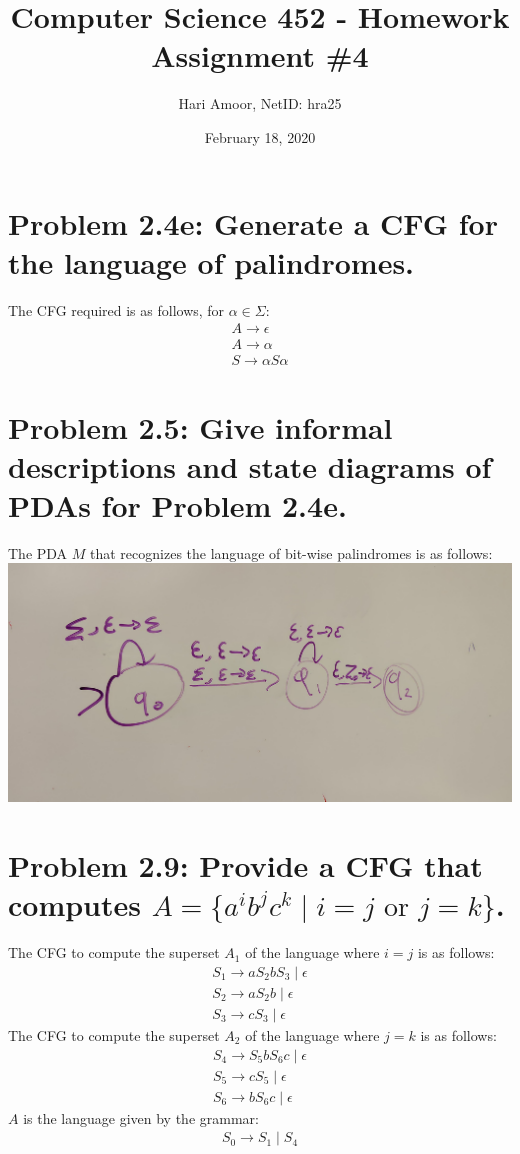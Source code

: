 \documentclass[12pt]{article}
\title{Computer Science 452 - Homework Assignment \#4}
\author{Hari Amoor, NetID: hra25}
\date{February 18, 2020}
\begin{document}
\maketitle
\section*{Problem 2.4e: Generate a CFG for the language of palindromes.}
The CFG required is as follows, for $\alpha \in \Sigma$:
\begin{align*}
  A \rightarrow \epsilon \\
  A \rightarrow \alpha \\
  S \rightarrow \alpha S \alpha
\end{align*}

\section*{Problem 2.5: Give informal descriptions and state diagrams of PDAs for Problem 2.4e.}
The PDA $M$ that recognizes the language of bit-wise palindromes is as follows: \\
\newline
\includegraphics[width=\linewidth]{images/problem25.jpg}

\section*{Problem 2.9: Provide a CFG that computes $A = \{a^{i}b^{j}c^{k} \mid i = j \text{ or } j = k\}$.}
The CFG to compute the superset $A_{1}$ of the language where $i = j$ is as follows:
\begin{align*}
  S_{1} \rightarrow aS_{2}bS_{3} \mid \epsilon \\
  S_{2} \rightarrow aS_{2}b \mid \epsilon \\
  S_{3} \rightarrow cS_{3} \mid \epsilon
\end{align*}
The CFG to compute the superset $A_{2}$ of the language where $j = k$ is as follows:
\begin{align*}
  S_{4} \rightarrow S_{5}bS_{6}c \mid \epsilon \\
  S_{5} \rightarrow cS_{5} \mid \epsilon \\
  S_{6} \rightarrow bS_{6}c \mid \epsilon
\end{align*}
$A$ is the language given by the grammar:
\begin{align*}
  S_{0} \rightarrow S_{1} \mid S_{4}
\end{align*}
\end{document}
